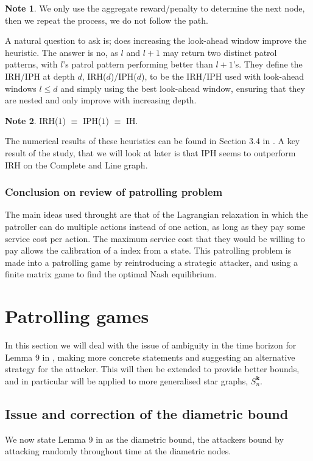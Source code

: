 \documentclass[a4paper,10pt]{article}
\theoremstyle{definition}
\theoremstyle{definition}
\theoremstyle{remark}
\theoremstyle{definition}
\newtheorem*{note}{Note}
\begin{document}
\begin{note}
We only use the aggregate reward/penalty to determine the next node, then we repeat the process, we do not follow the path.
\end{note}

A natural question to ask is; does increasing the look-ahead window improve the heuristic. The answer is no, as $l$ and $l+1$ may return two distinct patrol patterns, with $l$'s patrol pattern performing better than $l+1$'s. They define the IRH/IPH at depth $d$, IRH($d$)/IPH($d$), to be the IRH/IPH used with look-ahead windows $l \leq d$ and simply using the best look-ahead window, ensuring that they are nested and only improve with increasing depth.

\begin{note}
IRH($1$) $\equiv$ IPH($1$) $\equiv$ IH.
\end{note}

The numerical results of these heuristics can be found in Section 3.4 in \cite{Lin2013}. A key result of the study, that we will look at later is that IPH seems to outperform IRH on the Complete and Line graph.

\subsubsection{Conclusion on review of patrolling problem}
The main ideas used throught \cite{Lin2013} are that of the Lagrangian relaxation in which the patroller can do multiple actions instead of one action, as long as they pay some service cost per action. The maximum service cost that they would be willing to pay allows the calibration of a index from a state. This patrolling problem is made into a patrolling game by reintroducing a strategic attacker, and using a finite matrix game to find the optimal Nash equilibrium.


\section{Patrolling games}
\label{Section:Patrolling games}

In this section we will deal with the issue of ambiguity in the time horizon for Lemma 9 in \cite{Alpern2011}, making more concrete statements and suggesting an alternative strategy for the attacker. This will then be extended to provide better bounds, and in particular will be applied to more generalised star graphs, $S_{n}^{\bm{k}}$.

\subsection{Issue and correction of the diametric bound}
\label{Section:Issue and correction of the diametric bound}
We now state Lemma 9 in \cite{Alpern2011} as the diametric bound, the attackers bound by attacking randomly throughout time at the diametric nodes.
\end{document}
